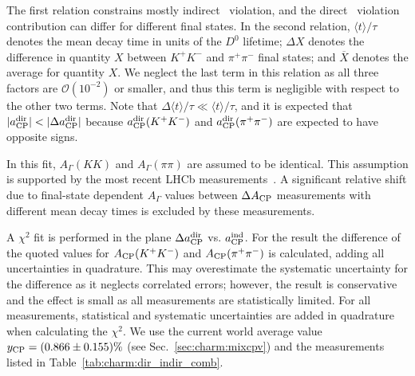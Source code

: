 The first relation constrains mostly indirect \cp\ violation, and the 
direct \cp\ violation contribution can differ for different final states. 
In the second relation, $\langle t\rangle/\tau$ denotes the mean decay 
time in units of the $D^0$ lifetime; $\Delta X$ denotes the difference 
in quantity $X$ between $K^+K^-$ and $\pi^+\pi^-$ final states; and $\overline{X}$ 
denotes the average for quantity $X$. 
We neglect the last term in this relation as all three factors are 
$\mathcal{O}(10^{-2})$ or smaller, and thus this term is negligible 
with respect to the other two terms. 
Note that $\Delta\langle t\rangle/\tau \ll\langle t\rangle/\tau$, and 
it is expected that $|a_{\rm CP}^{\rm dir}| < |\Delta a_{\rm CP}^{\rm dir}|$ 
because $a_{\rm CP}^{\rm dir}(K^+K^-)$ and $a_{\rm CP}^{\rm dir}(\pi^+\pi^-)$ 
are expected to have opposite signs. 

In this fit, $A_\Gamma(KK)$ and $A_\Gamma(\pi\pi)$ are assumed to be identical.
This assumption is supported by the most recent LHCb measurements~\cite{Aaij:2013ria}.
A significant relative shift due to final-state dependent $A_\Gamma$ values between $\Delta A_{\rm CP}$ measurements with different mean decay times is excluded by these measurements.

A $\chi^2$ fit is performed in the plane $\Delta a_{\rm CP}^{\rm dir}$ 
vs. $a_{\rm CP}^{\rm ind}$. 
For the \babar result the difference of the quoted values for 
$A_{\rm CP}(K^+K^-)$ and $A_{\rm CP}(\pi^+\pi^-)$ is calculated, 
adding all uncertainties in quadrature. 
This may overestimate the systematic uncertainty for the difference 
as it neglects correlated errors; however, the result is conservative 
and the effect is small as all measurements are statistically limited. 
For all measurements, statistical and systematic uncertainties are added 
in quadrature when calculating the $\chi^2$. 
We use the current world average value $y_{\rm CP} = (0.866 \pm 0.155)\%$ 
(see Sec.~\ref{sec:charm:mixcpv}) and the measurements listed in 
Table~\ref{tab:charm:dir_indir_comb}. 

